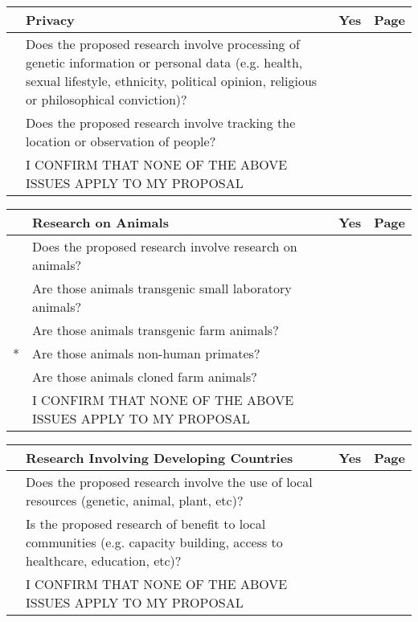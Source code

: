\documentclass[a4paper,11pt]{article}
\begin{document}
\vspace{0.5cm}
\begin{tabularx}{\linewidth}{ | c | X | c | c | }
\rowcolor{black} & {\centering\arraybackslash \color{white} \bf Privacy} & {\color{white} \bf Yes} & {\color{white} \bf Page} \\ \hline
   & Does the proposed research involve processing of genetic information or personal data (e.g. health, sexual lifestyle, ethnicity, political opinion, religious or philosophical conviction)? & & \\ \hline
   & Does the proposed research involve tracking the location or observation of people? & & \\ \hline
   & I CONFIRM THAT NONE OF THE ABOVE ISSUES APPLY TO MY PROPOSAL & & \cellcolor[gray]{0.8}\\ \hline
\end{tabularx}

\vspace{0.5cm}
\begin{tabularx}{\linewidth}{ | c | X | c | c | }
\rowcolor{black} & {\centering\arraybackslash \color{white} \bf Research on Animals} & {\color{white} \bf Yes} & {\color{white} \bf Page} \\ \hline
   & Does the proposed research involve research on animals?      & & \\ \hline
   & Are those animals transgenic small laboratory animals?       & & \\ \hline
   & Are those animals transgenic farm animals?                   & & \\ \hline
 * & Are those animals non-human primates?                        & & \\ \hline
   & Are those animals cloned farm animals?                       & & \\ \hline
   & I CONFIRM THAT NONE OF THE ABOVE ISSUES APPLY TO MY PROPOSAL & & \cellcolor[gray]{0.8}\\ \hline
\end{tabularx}

\vspace{0.5cm}
\begin{tabularx}{\linewidth}{ | c | X | c | c | }
\rowcolor{black} & {\centering\arraybackslash \color{white} \bf Research Involving Developing Countries} & {\color{white} \bf Yes} & {\color{white} \bf Page} \\ \hline
   & Does the proposed research involve the use of local resources (genetic, animal, plant, etc)?                             & & \\ \hline
   & Is the proposed research of benefit to local communities (e.g. capacity building, access to healthcare, education, etc)? & & \\ \hline
   & I CONFIRM THAT NONE OF THE ABOVE ISSUES APPLY TO MY PROPOSAL                                                             & & \cellcolor[gray]{0.8}\\ \hline
\end{tabularx}
\end{document}
